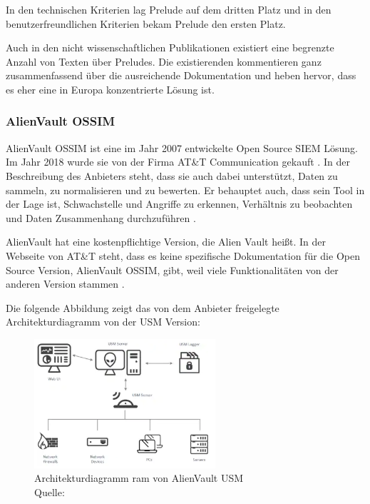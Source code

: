 In den technischen Kriterien lag Prelude auf dem dritten Platz und in den benutzerfreundlichen Kriterien bekam Prelude den ersten Platz. 

Auch in den nicht wissenschaftlichen Publikationen existiert eine begrenzte Anzahl von Texten über Preludes. Die existierenden kommentieren ganz zusammenfassend über die ausreichende Dokumentation und heben hervor, dass es eher eine in Europa konzentrierte Lösung ist.

\subsubsection{AlienVault OSSIM}
AlienVault OSSIM ist eine im Jahr 2007 entwickelte \gls{Open Source} SIEM Lösung. Im Jahr 2018 wurde sie von der Firma AT\&T Communication gekauft \citep{CBN_AV}. In der Beschreibung des Anbieters steht, dass sie auch dabei unterstützt, Daten zu sammeln, zu normalisieren und zu bewerten. Er behauptet auch, dass sein Tool in der Lage ist, Schwachstelle und Angriffe zu erkennen, Verhältnis zu beobachten und Daten Zusammenhang durchzuführen \citep{ATT_AVO}.

AlienVault hat eine kostenpflichtige Version, die Alien Vault  heißt. In der Webseite von AT\&T steht, dass es keine spezifische Dokumentation für die \gls{Open Source} Version, AlienVault OSSIM, gibt, weil viele Funktionalitäten von der anderen Version stammen \citep{ATT_AVO}. 

\newpage
Die folgende Abbildung zeigt das von dem Anbieter freigelegte Architekturdiagramm von der \gls{USM} Version:

\begin{figure}[H]
   \centering
   \includegraphics[width=0.6\textwidth]{assets/2_p6.png}
   \caption{Architekturdiagramm  ram von AlienVault \gls{USM} \\Quelle: \citep{ATT_AVO} }
   \centering
\end{figure}

